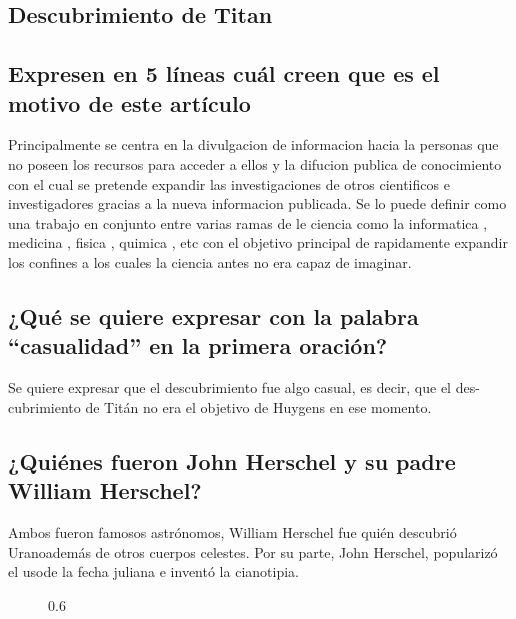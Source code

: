 \documentclass[11pt]{article}
\begin{document}
\begin{multicols}{2}

\section{Descubrimiento de Titan}

\subsection{Expresen en 5 líneas cuál creen que es el motivo de este artículo}

Principalmente se centra en la divulgacion de informacion hacia la personas que no poseen los recursos para acceder a ellos y la difucion publica de conocimiento con el cual se pretende expandir las investigaciones de otros cientificos e investigadores gracias a la nueva informacion publicada. Se lo puede definir como una trabajo en conjunto entre varias ramas de le ciencia como la informatica , medicina , fisica , quimica , etc con el objetivo principal de rapidamente expandir los confines a los cuales la ciencia antes no era capaz de imaginar. 
   
\subsection{¿Qué se quiere expresar con la palabra “casualidad” en la primera oración?}
   
Se quiere expresar que el descubrimiento fue algo casual, es decir, que el des-cubrimiento de Titán no era el objetivo de Huygens en ese momento.

\subsection{¿Quiénes fueron John Herschel y su padre William Herschel?}
  
  Ambos fueron famosos astrónomos, William Herschel fue quién descubrió Uranoademás de otros cuerpos celestes. Por su parte, John Herschel, popularizó el usode la fecha juliana e inventó la cianotipia. \cite{william}\cite{john}
  
  \begin{figure}{0.6\linewidth}
  

\end{figure}
\end{multicols}
\end{document}
